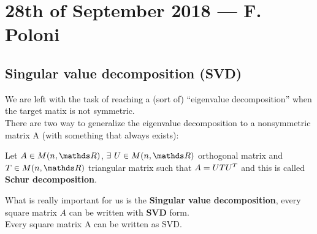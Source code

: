 \documentclass[computational_mathematics.tex]{subfiles}
\begin{document}
\section{28th of September 2018 --- F. Poloni}

\subsection{Singular value decomposition (SVD)}
We are left with the task of reaching a (sort of) ``eigenvalue decomposition'' when the target matix is not symmetric.\\
There are two way to generalize the eigenvalue decomposition to a
nonsymmetric matrix A (with something that always exists):

\begin{definition}
  Let $A \in M(n, \R)$, $\exists~U \in M(n, \R)$ orthogonal matrix and $T \in M(n, \R)$ triangular matrix such that $A = UT{U}^{T}$ and this is called \textbf{Schur decomposition}.
\end{definition}

What is really important for us is the \textbf{Singular value decomposition}, every square matrix $A$ can be written with \textbf{SVD} form.\\

\noindent Every square matrix A can be written as SVD.
\end{document}
